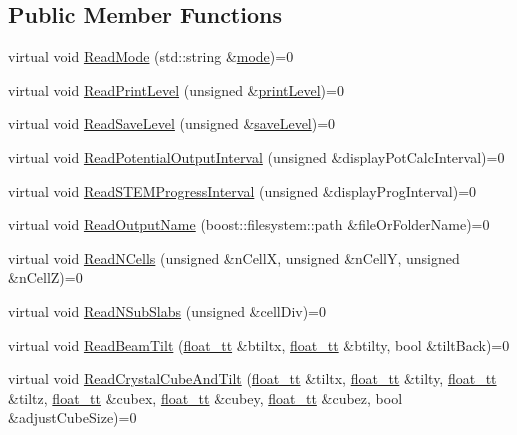 \subsection*{Public Member Functions}
\begin{DoxyCompactItemize}
\item 
virtual void \hyperlink{class_q_s_t_e_m_1_1_i_config_reader_afb5e25a11a4729f6ad9ce861f147b9bc}{Read\-Mode} (std\-::string \&\hyperlink{xyz2cfg_8m_aeb02c2817edf619fabdf1972b000db18}{mode})=0
\item 
virtual void \hyperlink{class_q_s_t_e_m_1_1_i_config_reader_a9875e11314ede437d3f43f6945cec2b9}{Read\-Print\-Level} (unsigned \&\hyperlink{qstem_8m_a24e096d96b8b76611e893ddd6c372ae5}{print\-Level})=0
\item 
virtual void \hyperlink{class_q_s_t_e_m_1_1_i_config_reader_af302e4f3dfd02f4f91beb8b2fbf9a377}{Read\-Save\-Level} (unsigned \&\hyperlink{qstem_8m_a5a7a04041b8d36231b865f8c9b07cd40}{save\-Level})=0
\item 
virtual void \hyperlink{class_q_s_t_e_m_1_1_i_config_reader_aaeb20d22ab7dc63b8d08e3e639f0b70c}{Read\-Potential\-Output\-Interval} (unsigned \&display\-Pot\-Calc\-Interval)=0
\item 
virtual void \hyperlink{class_q_s_t_e_m_1_1_i_config_reader_ad0e81932ac1f0558aded8504a0c92163}{Read\-S\-T\-E\-M\-Progress\-Interval} (unsigned \&display\-Prog\-Interval)=0
\item 
virtual void \hyperlink{class_q_s_t_e_m_1_1_i_config_reader_a43ff69abd1947865e31d0c44a005a006}{Read\-Output\-Name} (boost\-::filesystem\-::path \&file\-Or\-Folder\-Name)=0
\item 
virtual void \hyperlink{class_q_s_t_e_m_1_1_i_config_reader_ae235ba0e8d62f88ba6ff8efc7dd47997}{Read\-N\-Cells} (unsigned \&n\-Cell\-X, unsigned \&n\-Cell\-Y, unsigned \&n\-Cell\-Z)=0
\item 
virtual void \hyperlink{class_q_s_t_e_m_1_1_i_config_reader_a4879ae8fd49356bbcaa43ca87fa8f2e3}{Read\-N\-Sub\-Slabs} (unsigned \&cell\-Div)=0
\item 
virtual void \hyperlink{class_q_s_t_e_m_1_1_i_config_reader_add3ae967927006367b02c2cb628d0dcc}{Read\-Beam\-Tilt} (\hyperlink{namespace_q_s_t_e_m_a915d7caa497280d9f927c4ce8d330e47}{float\-\_\-tt} \&btiltx, \hyperlink{namespace_q_s_t_e_m_a915d7caa497280d9f927c4ce8d330e47}{float\-\_\-tt} \&btilty, bool \&tilt\-Back)=0
\item 
virtual void \hyperlink{class_q_s_t_e_m_1_1_i_config_reader_abcaf0bf16fc67a5a9d5ff2e8a1cb1aeb}{Read\-Crystal\-Cube\-And\-Tilt} (\hyperlink{namespace_q_s_t_e_m_a915d7caa497280d9f927c4ce8d330e47}{float\-\_\-tt} \&tiltx, \hyperlink{namespace_q_s_t_e_m_a915d7caa497280d9f927c4ce8d330e47}{float\-\_\-tt} \&tilty, \hyperlink{namespace_q_s_t_e_m_a915d7caa497280d9f927c4ce8d330e47}{float\-\_\-tt} \&tiltz, \hyperlink{namespace_q_s_t_e_m_a915d7caa497280d9f927c4ce8d330e47}{float\-\_\-tt} \&cubex, \hyperlink{namespace_q_s_t_e_m_a915d7caa497280d9f927c4ce8d330e47}{float\-\_\-tt} \&cubey, \hyperlink{namespace_q_s_t_e_m_a915d7caa497280d9f927c4ce8d330e47}{float\-\_\-tt} \&cubez, bool \&adjust\-Cube\-Size)=0

\end{DoxyCompactItemize}
